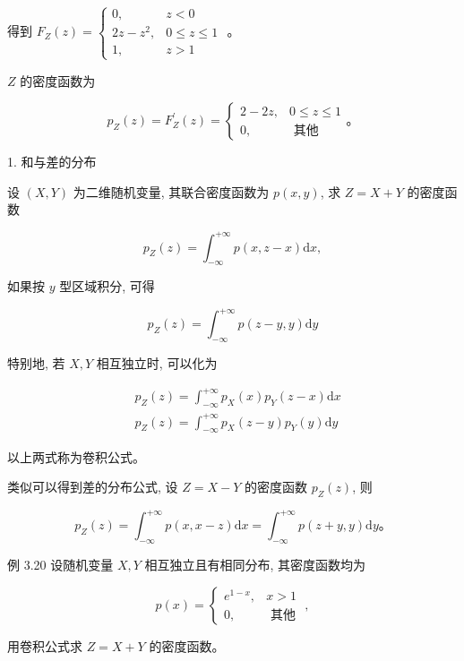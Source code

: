 \documentclass{beamer}
\begin{document}
	\begin{frame}
		得到 $F_{Z}(z)=\left\{\begin{array}{cc}0, & z<0 \\ 2 z-z^{2}, & 0 \leqslant z \leqslant 1 \\ 1, & z>1\end{array}\right.$ 。
		
		$Z$ 的密度函数为
		
		$$
		p_{Z}(z)=F_{Z}^{\prime}(z)=\left\{\begin{array}{cc}
			2-2 z, & 0 \leqslant z \leqslant 1 \\
			0, & \text { 其他 }
		\end{array} 。\right.
		$$
	\end{frame}
	
	\begin{frame}
		1. 和与差的分布
		
		设 $(X, Y)$ 为二维随机变量, 其联合密度函数为 $p(x, y)$, 求 $Z=X+Y$ 的密度函数
		
		 $$p_{Z}(z)=\int_{-\infty}^{+\infty} p(x, z-x) \mathrm{d} x,$$
		 
		 如果按 $y$ 型区域积分, 可得
		
		$$
		p_{Z}(z)=\int_{-\infty}^{+\infty} p(z-y, y) \mathrm{d} y
		$$
		
		特别地, 若 $X, Y$ 相互独立时, 可以化为
		
		$$
		\begin{aligned}
			& p_{Z}(z)=\int_{-\infty}^{+\infty} p_{X}(x) p_{Y}(z-x) \mathrm{d} x \\
			& p_{Z}(z)=\int_{-\infty}^{+\infty} p_{X}(z-y) p_{Y}(y) \mathrm{d} y
		\end{aligned}
		$$
		
		以上两式称为卷积公式。 
	\end{frame}
	
	\begin{frame}
		类似可以得到差的分布公式, 设 $Z=X-Y$ 的密度函数 $p_{Z}(z)$, 则
		
		$$
		p_{Z}(z)=\int_{-\infty}^{+\infty} p(x, x-z) \mathrm{d} x=\int_{-\infty}^{+\infty} p(z+y, y) \mathrm{d} y 。
		$$
	\end{frame}
	
	\begin{frame}
		例 3.20 设随机变量 $X, Y$ 相互独立且有相同分布, 其密度函数均为
		
		$$
		p(x)=\left\{\begin{array}{cc}
			e^{1-x}, & x>1 \\
			0, & \text { 其他 }
		\end{array},\right.
		$$
		
		用卷积公式求 $Z=X+Y$ 的密度函数。 
	\end{frame}
	
\end{document}
